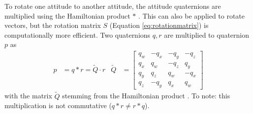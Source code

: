 To rotate one attitude to another attitude, the attitude quaternions are multiplied using the Hamiltonian product $*$ .
This can also be applied to rotate vectors, but the rotation matrix $S$ (Equation \ref{eq:rotationmatrix}) is computationally more efficient.
Two quaternions $q, r$ are multiplied to quaternion $p$ as \cite{stevens2015}
\begin{align}
    p &= q * r = \tilde Q \cdot r &
    \tilde Q &= \begin{bmatrix}
        q_w & -q_x & -q_y & -q_z \\
        q_x & q_w & -q_z & q_y \\
        q_y & q_z & q_w & -q_x \\
        q_z & -q_y & q_x & q_w
    \end{bmatrix} 
\end{align}
with the matrix $\tilde Q$ stemming from the Hamiltonian product \cite{stevens2015}.
To note: this multiplication is not commutative ($q*r \neq r*q$).

